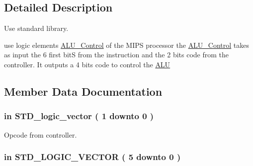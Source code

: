 \subsection{\-Detailed \-Description}
\-Use standard library. 

use logic elements \hyperlink{class_a_l_u___control}{\-A\-L\-U\-\_\-\-Control} of the \-M\-I\-P\-S processor the \hyperlink{class_a_l_u___control}{\-A\-L\-U\-\_\-\-Control} takes as input the 6 first bit\-S from the instruction and the 2 bits code from the controller. \-It outputs a 4 bits code to control the \hyperlink{class_a_l_u}{\-A\-L\-U} 

\subsection{\-Member \-Data \-Documentation}
\hypertarget{class_a_l_u___control_ab5e38318e201e0011dc9fe806b2c9ea4}{
\subsubsection[{\-A\-L\-U\-\_\-\-O\-P}]{ {\bfseries in } {\bfseries \-S\-T\-D\-\_\-logic\-\_\-vector (   1    downto    0  ) } }}\label{class_a_l_u___control_ab5e38318e201e0011dc9fe806b2c9ea4}


\-Opcode from controller. 

\hypertarget{class_a_l_u___control_aa057cc5bea77eab736c8c526429fa204}{
\subsubsection[{\-A\-L\-U\-\_\-\-Funct\-\_\-\-In}]{ {\bfseries in } {\bfseries \-S\-T\-D\-\_\-\-L\-O\-G\-I\-C\-\_\-\-V\-E\-C\-T\-O\-R (   5    downto    0  ) } }}\label{class_a_l_u___control_aa057cc5bea77eab736c8c526429fa204}



